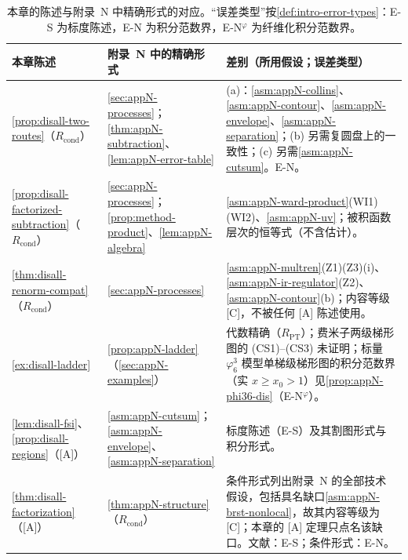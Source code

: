 \begin{table}[htbp]
\centering
\caption{本章的陈述与附录~N 中精确形式的对应。“误差类型”按\cref{def:intro-error-types}：E-S 为标度陈述，E-N 为积分范数界，E-N$^\varphi$ 为纤维化积分范数界。}
\label{tab:disall-correspondence}
\small
\begin{tabularx}{\textwidth}{@{}>{\raggedright\arraybackslash}p{}>{\raggedright\arraybackslash}p{}>{\raggedright\arraybackslash}X@{}}
\toprule
本章陈述 & 附录~N 中的精确形式 & 差别（所用假设；误差类型） \\
\midrule
\cref{prop:disall-two-routes}（$R_{\mathrm{cond}}$） & \cref{sec:appN-processes}；\cref{thm:appN-subtraction}、\cref{lem:appN-error-table} &
(a)：\cref{asm:appN-collins}、\cref{asm:appN-contour}、\cref{asm:appN-envelope}、\cref{asm:appN-separation}；(b) 另需复圆盘上的一致性；(c) 另需\cref{asm:appN-cutsum}。E-N。 \\
\cref{prop:disall-factorized-subtraction}（$R_{\mathrm{cond}}$） & \cref{sec:appN-processes}；\cref{prop:method-product}、\cref{lem:appN-algebra} &
\cref{asm:appN-ward-product}(WI1)(WI2)、\cref{asm:appN-uv}；被积函数层次的恒等式（不含估计）。 \\
\cref{thm:disall-renorm-compat}（$R_{\mathrm{cond}}$） & \cref{sec:appN-processes} &
\cref{asm:appN-multren}(Z1)(Z3)(i)、\cref{asm:appN-ir-regulator}(Z2)、\cref{asm:appN-contour}(b)；内容等级 [C]，不被任何 [A] 陈述使用。 \\
\cref{ex:disall-ladder} & \cref{prop:appN-ladder}（\cref{sec:appN-examples}） &
代数精确（$R_{\mathrm{PT}}$）；费米子两级梯形图的 (CS1)--(CS3) 未证明；标量 $\varphi^3_6$ 模型单梯级梯形图的积分范数界（实 $x\ge x_0>1$）见\cref{prop:appN-phi36-dis}（E-N$^\varphi$）。 \\
\cref{lem:disall-fsi}、\cref{prop:disall-regions}（[A]） & \cref{asm:appN-cutsum}；\cref{asm:appN-envelope}、\cref{asm:appN-separation} &
标度陈述（E-S）及其割图形式与积分形式。 \\
\cref{thm:disall-factorization}（[A]） & \cref{thm:appN-structure}（$R_{\mathrm{cond}}$） &
条件形式列出附录~N 的全部技术假设，包括具名缺口\cref{asm:appN-brst-nonlocal}，故其内容等级为 [C]；本章的 [A] 定理只点名该缺口。文献：E-S；条件形式：E-N。 \\
\bottomrule
\end{tabularx}
\end{table}

